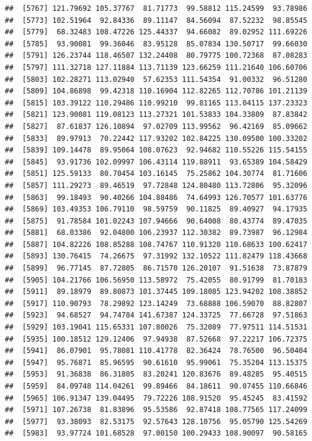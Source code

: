 \documentclass[
]{article}
\begin{document}
\begin{verbatim}
##  [5767] 121.79692 105.37767  81.71773  99.58812 115.24599  93.78986
##  [5773] 102.51964  92.84336  89.11147  84.56094  87.52232  98.85545
##  [5779]  68.32483 108.47226 125.44337  94.66082  89.02952 111.69226
##  [5785]  93.90081  99.36046  83.95128  85.07834 130.50717  99.66030
##  [5791] 126.23744 118.46507 132.24408  80.79775 100.72368  87.08283
##  [5797] 111.32718 127.11884 113.71139 123.66259 111.21640 106.60706
##  [5803] 102.28271 113.02940  57.62353 111.54354  91.00332  96.51280
##  [5809] 104.86898  99.42318 110.16904 112.82265 112.70786 101.21139
##  [5815] 103.39122 110.29486 110.99210  99.81165 113.04115 137.23323
##  [5821] 123.90081 119.08123 113.27321 101.53833 104.33809  87.83842
##  [5827]  87.61837 126.10894  97.02709 113.99562  96.42169  85.09662
##  [5833]  89.97913  70.22442 117.93202 102.84225 130.09500 100.33202
##  [5839] 109.14478  89.95064 108.07623  92.94682 110.55226 115.54155
##  [5845]  93.91736 102.09997 106.43114 119.88911  93.65389 104.58429
##  [5851] 125.59133  80.70454 103.16145  75.25862 104.30774  81.71606
##  [5857] 111.29273  89.46519  97.72848 124.80480 113.72806  95.32096
##  [5863]  99.18493  90.40266 104.88486  74.64993 126.70577 101.63776
##  [5869] 103.49353 106.79110  98.59759  90.11825  89.40927  94.17935
##  [5875]  91.78584 101.02243 107.94666  90.64008  80.43774  89.47035
##  [5881]  68.03386  92.04800 106.23937 112.30382  89.73987  96.12984
##  [5887] 104.82226 108.85288 108.74767 110.91320 110.68633 100.62417
##  [5893] 130.76415  74.26675  97.31992 132.10522 111.82479 118.43668
##  [5899]  96.77145  87.72805  86.71570 126.20107  91.51638  73.87879
##  [5905] 104.21766 106.56950 113.58972  75.42055  80.91799  81.70183
##  [5911]  89.18979  89.80873 101.37445 109.18085 123.94202 108.38852
##  [5917] 110.90793  78.29892 123.14249  73.68888 106.59070  88.82807
##  [5923]  94.68527  94.74784 141.67387 124.33725  77.66728  97.51863
##  [5929] 103.19041 115.65331 107.80026  75.32089  77.97511 114.51531
##  [5935] 100.18512 129.12406  97.94938  87.52668  97.22217 106.72375
##  [5941]  86.07901  95.78081 110.41778  82.36424  78.76500  96.50404
##  [5947]  95.76871  85.96595  90.61610  95.99061  75.35204 113.15375
##  [5953]  91.36838  86.31805  83.20241 120.83676  89.48285  95.40515
##  [5959]  84.09748 114.04261  99.89466  84.18611  90.07455 110.66846
##  [5965] 106.91347 139.04495  79.72226 108.91520  95.45245  83.41592
##  [5971] 107.26738  81.83896  95.53586  92.87418 108.77565 117.24099
##  [5977]  93.38093  82.53175  92.57643 128.10756  95.05790 125.54269
##  [5983]  93.97724 101.68528  97.00150 100.29433 108.90097  90.58165

\end{verbatim}
\end{document}
